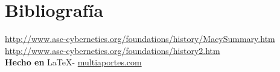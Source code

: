 \documentclass{article}
\begin{document}
\vspace{1cm}

\section*{Bibliograf\'ia}

\noindent \url{http://www.asc-cybernetics.org/foundations/history/MacySummary.htm}
\\
\noindent \url{http://www.asc-cybernetics.org/foundations/history2.htm}
\\

\large{\hfill \textbf{Hecho en } \LaTeX - \url{multiaportes.com}}
\end{document}
